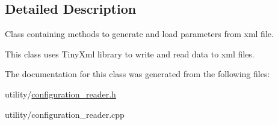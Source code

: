 \subsection{Detailed Description}
Class containing methods to generate and load parameters from xml file. 

This class uses Tiny\+Xml library to write and read data to xml files. 

The documentation for this class was generated from the following files\+:\begin{DoxyCompactItemize}
\item 
utility/\hyperlink{configuration__reader_8h}{configuration\+\_\+reader.\+h}\item 
utility/configuration\+\_\+reader.\+cpp\end{DoxyCompactItemize}
